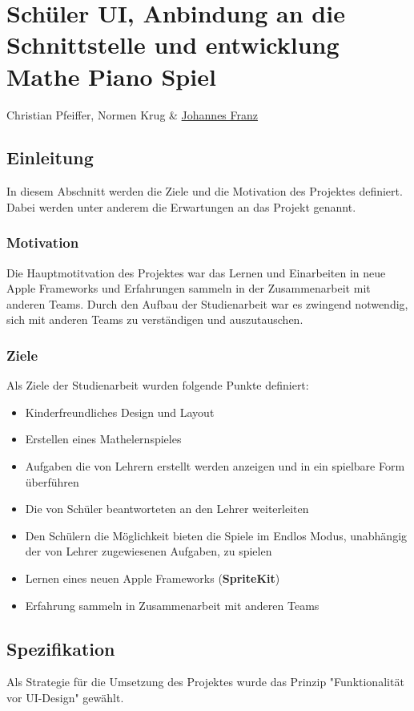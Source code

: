 \chapter{Schüler UI, Anbindung an die Schnittstelle und entwicklung Mathe Piano Spiel}
Christian Pfeiffer, Normen Krug \& \href{mailto:jofranz90@gmail.com?subject=Swift-Studienarbeit}{Johannes Franz}



\section{Einleitung}
In diesem Abschnitt werden die Ziele und die Motivation des Projektes definiert. Dabei werden unter anderem die Erwartungen an das Projekt genannt.

\subsection{Motivation}
Die Hauptmotitvation des Projektes war das Lernen und Einarbeiten in neue Apple Frameworks und Erfahrungen sammeln in der Zusammenarbeit mit anderen Teams. Durch den Aufbau der  Studienarbeit war es zwingend notwendig, sich mit anderen Teams zu verständigen und auszutauschen.  

\subsection{Ziele}
Als Ziele der Studienarbeit wurden folgende Punkte definiert: 
\begin{itemize}
\item Kinderfreundliches Design und Layout
\item Erstellen eines Mathelernspieles 
\item Aufgaben die von Lehrern erstellt werden anzeigen und in ein spielbare Form überführen
\item Die von Schüler beantworteten an den Lehrer weiterleiten
\item Den Schülern die Möglichkeit bieten die Spiele im Endlos Modus, unabhängig der von Lehrer zugewiesenen Aufgaben, zu spielen
\item Lernen eines neuen Apple Frameworks (\textbf{SpriteKit})
\item Erfahrung sammeln in Zusammenarbeit mit anderen Teams
\end{itemize}
\section{Spezifikation}
Als Strategie für die Umsetzung des Projektes wurde das Prinzip "Funktionalität vor UI-Design" gewählt.
